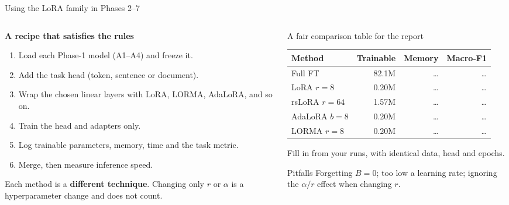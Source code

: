 \documentclass[aspectratio=169,11pt]{beamer}
\begin{document}
\begin{frame}{Using the LoRA family in Phases 2--7}
  \begin{columns}[T]
    \begin{column}{0.5\textwidth}
      \small
      \textbf{A recipe that satisfies the rules}
      \begin{enumerate}
        \item Load each Phase-1 model (A1--A4) and freeze it.
        \item Add the task head (token, sentence or document).
        \item Wrap the chosen linear layers with LoRA, LORMA, AdaLoRA, and so on.
        \item Train the head and adapters only.
        \item Log trainable parameters, memory, time and the task metric.
        \item Merge, then measure inference speed.
      \end{enumerate}
      Each method is a \textbf{different technique}. Changing only $r$ or $\alpha$ is a hyperparameter change and does not count.
    \end{column}
    \begin{column}{0.46\textwidth}
      \begin{block}{A fair comparison table for the report}
        \scriptsize
        \begin{tabular}{@{}lrrr@{}}
          \toprule
          Method & Trainable & Memory & Macro-F1\\
          \midrule
          Full FT & 82.1M & \ldots & \ldots\\
          LoRA $r=8$ & 0.20M & \ldots & \ldots\\
          rsLoRA $r=64$ & 1.57M & \ldots & \ldots\\
          AdaLoRA $b=8$ & 0.20M & \ldots & \ldots\\
          LORMA $r=8$ & 0.20M & \ldots & \ldots\\
          \bottomrule
        \end{tabular}
        \vspace{1mm}

        Fill in from your runs, with identical data, head and epochs.
      \end{block}
      \begin{alertblock}{Pitfalls}
        \scriptsize
        Forgetting $B=0$; too low a learning rate; ignoring the $\alpha/r$ effect when changing $r$.
      \end{alertblock}
    \end{column}
  \end{columns}
\end{frame}
\end{document}
